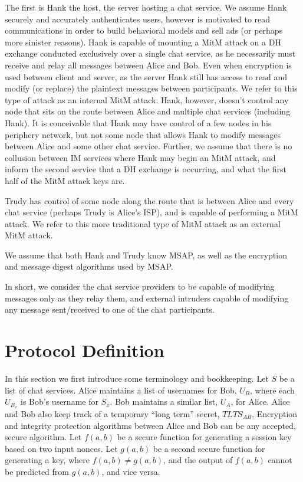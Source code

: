 \documentclass[twoside,10pt]{article}
\begin{document}
\begin{multicols}{2}
The first is Hank the host, the server hosting a chat service.  We assume Hank securely and accurately authenticates users, however is motivated to read communications in order to build behavioral models and sell ads (or perhaps more sinister reasons).  Hank is capable of mounting a MitM attack on a DH exchange conducted exclusively over a single chat service, as he necessarily must receive and relay all messages between Alice and Bob.  Even when encryption is used between client and server, as the server Hank still has access to read and modify (or replace) the plaintext messages between participants.  We refer to this type of attack as an internal MitM attack.  Hank, however, doesn't  control any node that sits on the route between Alice and multiple chat services (including Hank).  It is conceivable that Hank may have control of a few nodes in his periphery network, but not some node that allows Hank to modify messages between Alice and some other chat service.  Further, we assume that there is no collusion between IM services where Hank may begin an MitM attack, and inform the second service that a DH exchange is occurring, and what the first half of the MitM attack keys are.

Trudy has control of some node along the route that is between Alice and every chat service (perhaps Trudy is Alice's ISP), and is capable of performing a MitM attack.  We refer to this more traditional type of MitM attack as an external MitM attack.

We assume that both Hank and Trudy know MSAP, as well as the encryption and message digest algorithms used by MSAP.

In short, we consider the chat service providers to be capable of modifying messages only as they relay them, and external intruders capable of modifying any message sent/received to one of the chat participants.  

\section{Protocol Definition}\label{sec:protoDef}
In this section we first introduce some terminology and bookkeeping.  Let $S$ be a list of chat services.  Alice maintains a list of usernames for Bob, $U_{B}$, where each $U_{B_x}$ is Bob's username for $S_x$.  Bob maintains a similar list, $U_{A}$, for Alice.  Alice and Bob also keep track of a temporary ``long term'' secret, $TLTS_{AB}$.  Encryption and integrity protection algorithms between Alice and Bob can be any accepted, secure algorithm.  Let $f(a,b)$ be a secure function for generating a session key based on two input nonces.  Let $g(a,b)$ be a second secure function for generating a key, where $f(a,b) \neq g(a,b)$, and the output of $f(a,b)$ cannot be predicted from $g(a,b)$, and vice versa.


\end{multicols}
\end{document}
